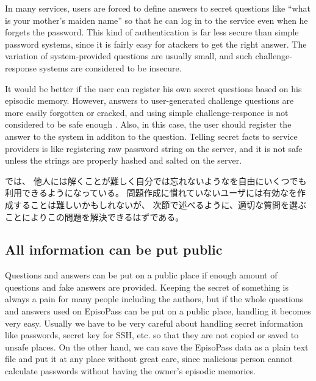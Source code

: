 \documentclass{article}
\begin{document}
In many services, users are forced to define answers to secret questions like
``what is your mother's maiden name''
so that he can log in to the service even when he forgets the password.
This kind of authentication is far less secure than simple password systems,
since it is fairly easy for atackers to get the right answer.
The variation of system-provided questions are usually small, and
such challenge-response systems are considered to be insecure\cite{Rabkin:2008:PKQ:1408664.1408667}.

It would be better if the user can register his own secret questions
based on his episodic memory.
However, answers to user-generated challenge questions are more easily
forgotten or cracked,
and using simple challenge-responce is not considered to be safe enough
\cite{Just:2009:PCC:1572532.1572543}\cite{Schechter:2009:NSM:1607723.1608145}.
%
Also, in this case,
the user should register the answer to the system in additon to the question.
Telling secret facts to service providers is like
registering raw password string on the server,
and it is not safe unless the strings are properly hashed and salted on the server.

%
%

{\EP}では、
他人には解くことが難しく自分では忘れないような{\SQ}を自由にいくつでも利用できるようになっている。
問題作成に慣れていないユーザには有効な{\SQ}を作成することは難しいかもしれないが、
次節で述べるように、適切な質問を選ぶことによりこの問題を解決できるはずである。

\subsection{All information can be put public}

Questions and answers can be put on a public place
if enough amount of questions and fake answers are provided.
%
Keeping the secret of something is always a pain for many people including
the authors, but if the whole questions and answers used on EpisoPass
can be put on a public place,
handling it becomes very easy.
Usually we have to be very careful about handling
secret information like passwords, secret key for SSH, etc.
so that they are not copied or saved to unsafe places.
On the other hand,
we can save the EpisoPass data as a plain text file and put it at
any place without great care, since malicious person cannot calculate
passwords without having the owner's episodic memories.
\end{document}
